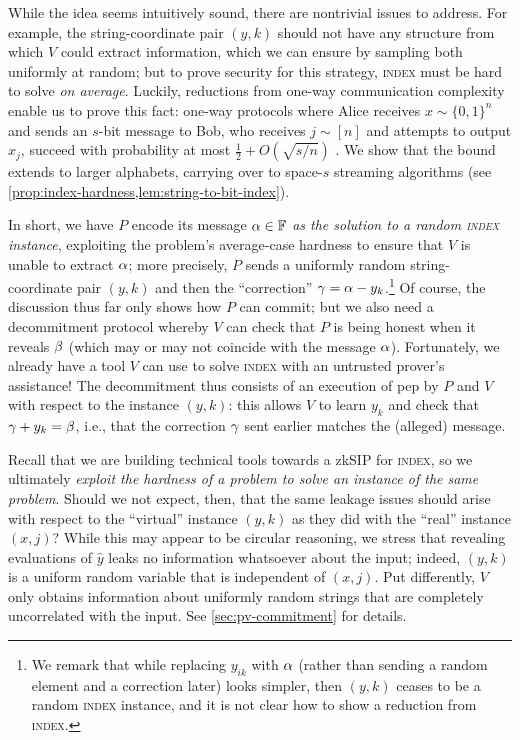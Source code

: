 \documentclass[10pt,a4paper]{article}
\theoremstyle{definition}
\newcommand{\zksip}{\textrm{zkSIP}}
\newcommand{\field}{\mathbb{F}}
\newcommand{\bitset}{\{0,1\}}
\newcommand{\indexproblem}{\normalfont\textsc{index}\xspace}
\newcommand{\pepprotocol}{\textsf{pep}\xspace}
\newcommand{\pcommitstring}{y}
\def\fe#1{
    \ifnum#1=1
        \alpha
    \else
    \ifnum#1=2
        \beta
    \else
    \ifnum#1=3
        \gamma
    \fi\fi\fi
}
\begin{document}
    While the idea seems intuitively sound, there are nontrivial issues to address. For example, the string-coordinate pair $(\pcommitstring,k)$ should not have any structure from which $V$ could extract information, which we can ensure by sampling both uniformly at random; but to prove security for this strategy, \indexproblem must be hard to solve \emph{on average}. Luckily, reductions from one-way communication complexity enable us to prove this fact: one-way protocols where Alice receives $x \sim \bitset^n$ and sends an $s$-bit message to Bob, who receives $j \sim [n]$ and attempts to output $x_j$, succeed with probability at most $\frac1{2} + O(\sqrt{s/n})$ \cite{RY20}. We show that the bound extends to larger alphabets, carrying over to space-$s$ streaming algorithms (see \cref{prop:index-hardness,lem:string-to-bit-index}).
    
    In short, we have $P$ encode its message $\fe1 \in \field$ \emph{as the solution to a random \indexproblem instance}, exploiting the problem's average-case hardness to ensure that $V$ is unable to extract $\fe1$; more precisely, $P$ sends a uniformly random string-coordinate pair $(\pcommitstring, k)$ and then the ``correction'' $\fe3 = \fe1 - \pcommitstring_k$.\footnote{We remark that while replacing $\pcommitstring_{ik}$ with $\fe1$ (rather than sending a random element and a correction later) looks simpler, then $(\pcommitstring,k)$ ceases to be a random \indexproblem instance, and it is not clear how to show a reduction from \indexproblem.} Of course, the discussion thus far only shows how $P$ can commit; but we also need a decommitment protocol whereby $V$ can check that $P$ is being honest when it reveals $\fe2$ (which may or may not coincide with the message $\fe1$). Fortunately, we already have a tool $V$ can use to solve \indexproblem with an untrusted prover's assistance! The decommitment thus consists of an execution of \pepprotocol by $P$ and $V$ with respect to the instance $(\pcommitstring,k)$: this allows $V$ to learn $\pcommitstring_k$ and check that $\fe3 + \pcommitstring_k = \fe2$, i.e., that the correction $\fe3$ sent earlier matches the (alleged) message.
    
    Recall that we are building technical tools towards a \zksip{} for \indexproblem, so we ultimately \emph{exploit the hardness of a problem to solve an instance of the same problem}. Should we not expect, then, that the same leakage issues should arise with respect to the ``virtual'' instance $(\pcommitstring, k)$ as they did with the ``real'' instance $(x,j)$? While this may appear to be circular reasoning, we stress that revealing evaluations of $\hat y$ leaks no information whatsoever about the input; indeed, $(\pcommitstring,k)$ is a uniform random variable that is independent of $(x,j)$. Put differently, $V$ only obtains information about uniformly random strings that are completely uncorrelated with the input. See \cref{sec:pv-commitment} for details.
    
\end{document}
